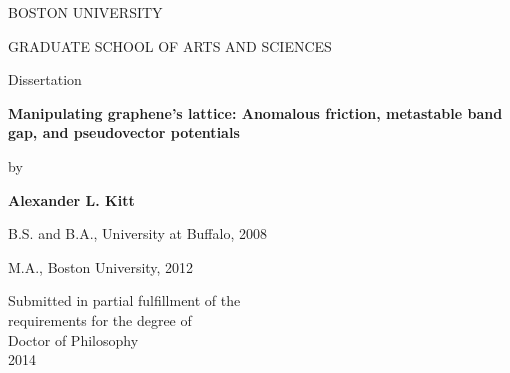 \begin{titlepage}   %
\begin{center}

  BOSTON UNIVERSITY\\

  \vspace{1mm}

  GRADUATE SCHOOL OF ARTS AND SCIENCES\\

  \vspace{.75in}

  Dissertation\\

  \vspace{.75in}

  \textbf{Manipulating graphene's lattice: Anomalous friction, metastable band gap, and pseudovector potentials}\\

  \vspace{2mm}
  \vspace{.4in}

  by\\

  \vspace{.4in}

  {\bf Alexander L. Kitt}\\

  \vspace{1mm}

  B.S. and B.A., University at Buffalo, 2008\\

  \vspace{-1.5mm}

  M.A., Boston University, 2012

  \vspace{-2.5mm}

  \vfill

  Submitted in partial fulfillment of the\\
  requirements for the degree of\\
  Doctor of Philosophy\\
  2014\\

\end{center}
\end{titlepage}